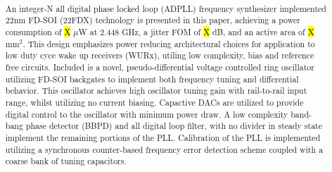 

\pagestyle{fancy}
\fancyhf{}
\fancyhead[LE,RO]{\fontfamily{\sfdefault}\selectfont \textbf{\rightmark}}
\title{\textbf{}}
\date{}

\sloppy\RaggedRight\raggedbottom
	
	
	\pagebreak
	\thispagestyle{blank}
	\null\pagebreak

	\justify
	\setcounter{page}{1}
	\thispagestyle{nohdr}
	\large\fontfamily{\sfdefault}\selectfont \		
	\begin{abstract} \large\fontfamily{\rmdefault}\selectfont \
		
		\vspace{-2em}An integer-N all digital phase locked loop (ADPLL) frequency synthesizer implemented 22nm FD-SOI (22FDX) technology is presented in this paper, achieving a power consumption of \hl{X} $\mu$W at 2.448 GHz, a jitter FOM of \hl{X} dB, and an active area of \hl{X} mm$^2$. This design emphasizes power reducing architectural choices for application to low duty cyce wake up receivers (WURx), utiling low complexity, bias and reference free circuits. Included is a novel, pseudo-differential voltage controlled ring oscillator utilizing FD-SOI backgates to implement both frequency tuning and differential behavior. This oscillator achieves high oscillator tuning gain with rail-to-rail input range, whilst utilizing no current biasing. Capactive DACs are utilized to provide digital control to the oscillator with minimum power draw. A low complexity band-bang phase detector (BBPD) and all digital loop filter, with no divider in steady state implement the remaining portions of the PLL. Calibration of the PLL is implemented utilizing a synchronous counter-based frequency error detection scheme coupled with a coarse bank of tuning capacitors.
	\end{abstract}

